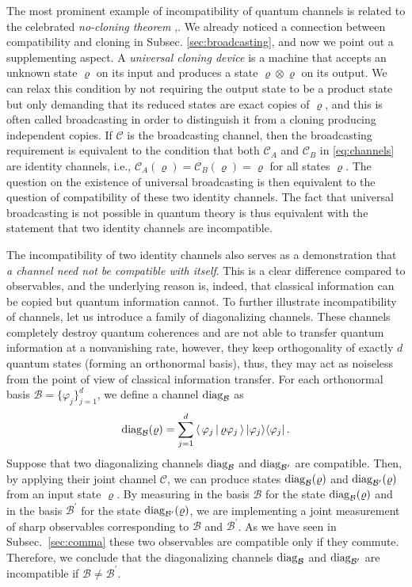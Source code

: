 \documentclass[12pt]{iopart}
\theoremstyle{definition}
\newcommand{\ip}[2]{\left\langle\,#1\,|\,#2\,\right\rangle} %
\newcommand{\kb}[2]{|#1\rangle\langle#2|} %
\newcommand{\Cc}{\mathcal{C}} %
\begin{document}
{The most prominent example of incompatibility of quantum channels is related to the celebrated \emph{no-cloning theorem}  \cite{Dieks82},\cite{WoZu82}. 
We already noticed a connection between compatibility and cloning in Subsec. \ref{sec:broadcasting}, and now we point out a supplementing aspect. A \emph{universal cloning device} \cite{BuHi96} is a machine that accepts an unknown state $\varrho$ on its input and produces a state $\varrho\otimes\varrho$ on its output. We can relax this condition by not requiring the output state to be a product state but only demanding that its reduced states are exact copies of $\varrho$, and this is often called broadcasting in order to distinguish it from a cloning producing independent copies. 
If $\Cc$ is the broadcasting channel, then the broadcasting requirement is equivalent to the condition that both $\Cc_A$ and $\Cc_B$ in \eqref{eq:channels} are identity channels, i.e., $\Cc_A(\varrho)=\Cc_B(\varrho)=\varrho$ for all states $\varrho$. The question on the existence of universal broadcasting is then equivalent to the question of compatibility of these two identity channels. 
The fact that universal broadcasting is not possible in quantum theory is thus equivalent with the statement that two identity channels are incompatible. 

The incompatibility of two identity channels also serves as a demonstration that \emph{a channel need not be compatible with itself}. This is a clear difference compared to observables, and the underlying reason is, indeed, that classical information can be copied but quantum information cannot. 
To further illustrate incompatibility of channels, let us introduce a family of diagonalizing channels. 
These channels completely destroy quantum coherences and are not able to transfer quantum information at a nonvanishing rate, however, they keep orthogonality of exactly $d$ quantum states (forming an orthonormal basis), thus, they may act as noiseless from the point of view of classical information transfer. 
For each orthonormal basis $\mathcal{B}=\{\varphi_j\}_{j=1}^d$, we define a channel ${\rm diag}_{\mathcal{B}}$ as
\begin{equation}
{\rm diag}_{\mathcal{B}}(\varrho)=\sum_{j=1}^d \ip{\varphi_j}{\varrho\varphi_j}
\kb{\varphi_j}{\varphi_j}\, .
\end{equation}
Suppose that two diagonalizing channels ${\rm diag}_{\mathcal{B}}$ 
and ${\rm diag}_{\mathcal{B^\prime}}$ are  compatible. 
Then, by applying their joint channel $\Cc$, we can produce states  ${\rm diag}_{\mathcal{B}}(\varrho)$ and ${\rm diag}_{\mathcal{B^\prime}}(\varrho)$ from an input state $\varrho$.
By measuring in the basis $\mathcal{B}$ for the state ${\rm diag}_{\mathcal{B}}(\varrho)$ and in the basis $\mathcal{B^\prime}$ for the state ${\rm diag}_{\mathcal{B^\prime}}(\varrho)$, we are implementing a joint measurement of sharp observables corresponding to $\mathcal{B}$ and $\mathcal{B^\prime}$.
As we have seen in Subsec.~\ref{sec:comma} these two observables are compatible only if they commute. 
Therefore, we conclude that the diagonalizing channels ${\rm diag}_{\mathcal{B}}$ and ${\rm diag}_{\mathcal{B^\prime}}$ are  incompatible if $\mathcal{B} \neq \mathcal{B^\prime}$.

}
\end{document}
